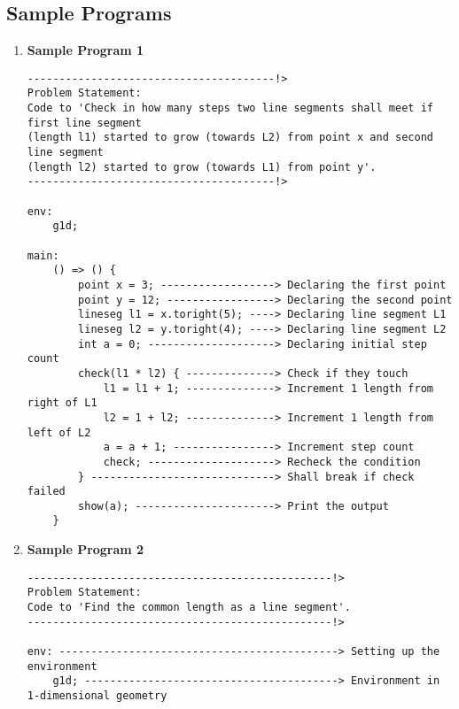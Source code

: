 \documentclass{article}
\begin{document}
\subsection{Sample Programs}
\begin{enumerate}
\item \textbf{Sample Program 1}
\begin{verbatim}
---------------------------------------!>
Problem Statement:
Code to 'Check in how many steps two line segments shall meet if first line segment
(length l1) started to grow (towards L2) from point x and second line segment
(length l2) started to grow (towards L1) from point y'.
---------------------------------------!>

env:
    g1d;

main:
    () => () {
        point x = 3; ------------------> Declaring the first point
        point y = 12; -----------------> Declaring the second point
        lineseg l1 = x.toright(5); ----> Declaring line segment L1
        lineseg l2 = y.toright(4); ----> Declaring line segment L2
        int a = 0; --------------------> Declaring initial step count
        check(l1 * l2) { --------------> Check if they touch
            l1 = l1 + 1; --------------> Increment 1 length from right of L1
            l2 = 1 + l2; --------------> Increment 1 length from left of L2
            a = a + 1; ----------------> Increment step count
            check; --------------------> Recheck the condition
        } -----------------------------> Shall break if check failed
        show(a); ----------------------> Print the output
    }
\end{verbatim}
\item \textbf{Sample Program 2}
\begin{verbatim}
------------------------------------------------!>
Problem Statement:
Code to 'Find the common length as a line segment'.
------------------------------------------------!>

env: --------------------------------------------> Setting up the environment
    g1d; ----------------------------------------> Environment in 1-dimensional geometry


\end{verbatim}
\end{enumerate}
\end{document}
